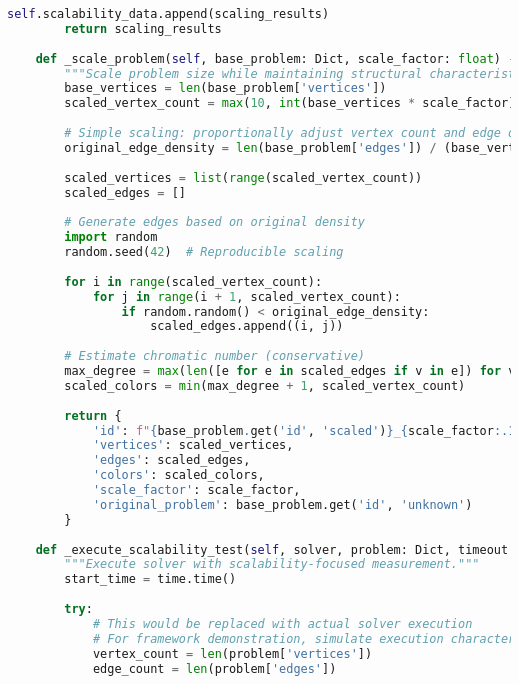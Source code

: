 \begin{lstlisting}[language=Python, caption=Scalability Analysis and Deployment Boundary Assessment]
        self.scalability_data.append(scaling_results)
        return scaling_results
    
    def _scale_problem(self, base_problem: Dict, scale_factor: float) -> Dict:
        """Scale problem size while maintaining structural characteristics."""
        base_vertices = len(base_problem['vertices'])
        scaled_vertex_count = max(10, int(base_vertices * scale_factor))
        
        # Simple scaling: proportionally adjust vertex count and edge density
        original_edge_density = len(base_problem['edges']) / (base_vertices * (base_vertices - 1) / 2)
        
        scaled_vertices = list(range(scaled_vertex_count))
        scaled_edges = []
        
        # Generate edges based on original density
        import random
        random.seed(42)  # Reproducible scaling
        
        for i in range(scaled_vertex_count):
            for j in range(i + 1, scaled_vertex_count):
                if random.random() < original_edge_density:
                    scaled_edges.append((i, j))
        
        # Estimate chromatic number (conservative)
        max_degree = max(len([e for e in scaled_edges if v in e]) for v in scaled_vertices) if scaled_edges else 1
        scaled_colors = min(max_degree + 1, scaled_vertex_count)
        
        return {
            'id': f"{base_problem.get('id', 'scaled')}_{scale_factor:.1f}x",
            'vertices': scaled_vertices,
            'edges': scaled_edges,
            'colors': scaled_colors,
            'scale_factor': scale_factor,
            'original_problem': base_problem.get('id', 'unknown')
        }
    
    def _execute_scalability_test(self, solver, problem: Dict, timeout: float) -> Dict:
        """Execute solver with scalability-focused measurement."""
        start_time = time.time()
        
        try:
            # This would be replaced with actual solver execution
            # For framework demonstration, simulate execution characteristics
            vertex_count = len(problem['vertices'])
            edge_count = len(problem['edges'])
            

\end{lstlisting}
